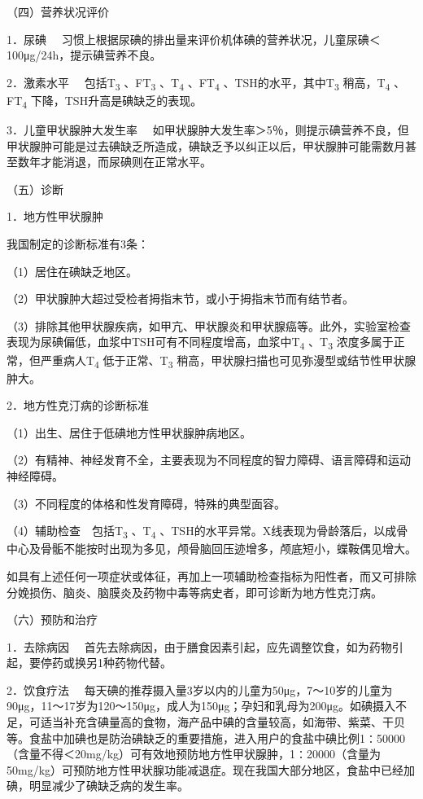 （四）营养状况评价

{1．尿碘}
　习惯上根据尿碘的排出量来评价机体碘的营养状况，儿童尿碘＜100μg/24h，提示碘营养不良。

{2．激素水平} 　包括T\textsubscript{3} 、FT\textsubscript{3}
、T\textsubscript{4} 、FT\textsubscript{4}
、TSH的水平，其中T\textsubscript{3} 稍高，T\textsubscript{4}
、FT\textsubscript{4} 下降，TSH升高是碘缺乏的表现。

{3．儿童甲状腺肿大发生率}
　如甲状腺肿大发生率＞5％，则提示碘营养不良，但甲状腺肿可能是过去碘缺乏所造成，碘缺乏予以纠正以后，甲状腺肿可能需数月甚至数年才能消退，而尿碘则在正常水平。

（五）诊断

{1．地方性甲状腺肿}

我国制定的诊断标准有3条：

（1）居住在碘缺乏地区。

（2）甲状腺肿大超过受检者拇指末节，或小于拇指末节而有结节者。

（3）排除其他甲状腺疾病，如甲亢、甲状腺炎和甲状腺癌等。此外，实验室检查表现为尿碘偏低，血浆中TSH可有不同程度增高，血浆中T\textsubscript{4}
、T\textsubscript{3} 浓度多属于正常，但严重病人T\textsubscript{4}
低于正常、T\textsubscript{3}
稍高，甲状腺扫描也可见弥漫型或结节性甲状腺肿大。

{2．地方性克汀病的诊断标准}

（1）出生、居住于低碘地方性甲状腺肿病地区。

（2）有精神、神经发育不全，主要表现为不同程度的智力障碍、语言障碍和运动神经障碍。

（3）不同程度的体格和性发育障碍，特殊的典型面容。

（4）辅助检查　包括T\textsubscript{3} 、T\textsubscript{4}
、TSH的水平异常。X线表现为骨龄落后，以成骨中心及骨骺不能按时出现为多见，颅骨脑回压迹增多，颅底短小，蝶鞍偶见增大。

如具有上述任何一项症状或体征，再加上一项辅助检查指标为阳性者，而又可排除分娩损伤、脑炎、脑膜炎及药物中毒等病史者，即可诊断为地方性克汀病。

（六）预防和治疗

{1．去除病因}
　首先去除病因，由于膳食因素引起，应先调整饮食，如为药物引起，要停药或换另1种药物代替。

{2．饮食疗法}
　每天碘的推荐摄入量3岁以内的儿童为50μg，7～10岁的儿童为90μg，11～17岁为120～150μg，成人为150μg；孕妇和乳母为200μg。如碘摄入不足，可适当补充含碘量高的食物，海产品中碘的含量较高，如海带、紫菜、干贝等。食盐中加碘也是防治碘缺乏的重要措施，进入用户的食盐中碘比例1∶50000（含量不得＜20mg/kg）可有效地预防地方性甲状腺肿，1∶20000（含量为50mg/kg）可预防地方性甲状腺功能减退症。现在我国大部分地区，食盐中已经加碘，明显减少了碘缺乏病的发生率。

